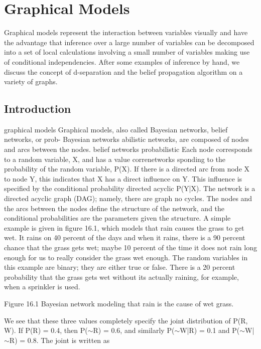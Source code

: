\chapter{Graphical Models}
\label{chap:16-graphical-models}

Graphical models represent the interaction between variables visually and have the advantage that inference over a large number of variables can be decomposed into a set of local calculations involving a small number of variables making use of conditional independencies. After some examples of inference by hand, we discuss the concept of d-separation and the belief propagation algorithm on a variety of graphs.

\section{Introduction}

graphical models Graphical models, also called Bayesian networks, belief networks, or prob- Bayesian networks abilistic networks, are composed of nodes and arcs between the nodes. belief networks probabilistic Each node corresponds to a random variable, X, and has a value correnetworks sponding to the probability of the random variable, P(X). If there is a directed arc from node X to node Y, this indicates that X has a direct influence on Y. This influence is specified by the conditional probability directed acyclic P(Y|X). The network is a directed acyclic graph (DAG); namely, there are graph no cycles. The nodes and the arcs between the nodes define the structure of the network, and the conditional probabilities are the parameters given the structure. A simple example is given in figure 16.1, which models that rain causes the grass to get wet. It rains on 40 percent of the days and when it rains, there is a 90 percent chance that the grass gets wet; maybe 10 percent of the time it does not rain long enough for us to really consider the grass wet enough. The random variables in this example are binary; they are either true or false. There is a 20 percent probability that the grass gets wet without its actually raining, for example, when a sprinkler is used.

Figure 16.1 Bayesian network modeling that rain is the cause of wet grass.

We see that these three values completely specify the joint distribution of P(R, W). If P(R) = 0.4, then P($\sim$R) = 0.6, and similarly P($\sim$W|R) = 0.1 and P($\sim$W|$\sim$R) = 0.8. The joint is written as

